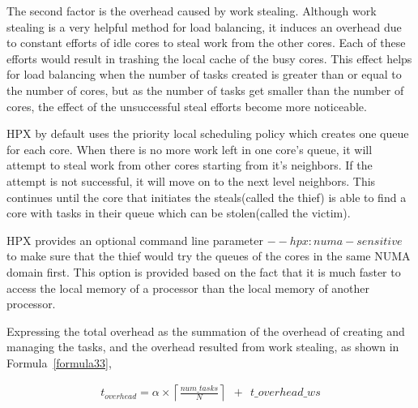 
The second factor is the overhead caused by work stealing. Although work stealing is a very helpful method for load balancing, it induces an overhead due to constant efforts of idle cores to steal work from the other cores. Each of these efforts would result in trashing the local cache of the busy cores. This effect helps for load balancing when the number of tasks created is greater than or equal to the number of cores, but as the number of tasks get smaller than the number of cores, the effect of the unsuccessful steal efforts become more noticeable.

HPX by default uses the priority local scheduling policy which creates one queue for each core. When there is no more work left in one core's queue, it will attempt to steal work from other cores starting from it's neighbors. If the attempt is not successful, it will move on to the next level neighbors. This continues until the core that initiates the steals(called the thief) is able to find a core with tasks in their queue which can be stolen(called the victim). 

HPX provides an optional command line parameter ${--hpx:numa-sensitive}$ to make sure that the thief would try the queues of the cores in the same NUMA domain first. This option is provided based on the fact that it is much faster to access the local memory of a processor than the local memory of another processor.  

Expressing the total overhead as the summation of the overhead of creating and managing the tasks, and the overhead resulted from work stealing, as shown in Formula~\ref{formula33},
 
\begin{equation}\label{formula33}  
\begin{aligned}
t_{overhead}=\alpha\times{\left\lceil{\frac{num\_{tasks}}{N}}\right\rceil}\:\:+\:\:t\_{overhead\_{ws}}
\end{aligned}
\end{equation}

